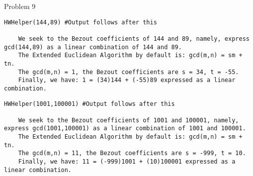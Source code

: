 \begin{problem}{Problem 9}
    \begin{Highlight}[Solution - \# 43]
    \begin{lstlisting}[style=stackoverflow]
    HWHelper(144,89) #Output follows after this

    We seek to the Bezout coefficients of 144 and 89, namely, express gcd(144,89) as a linear combination of 144 and 89.
    The Extended Euclidean Algorithm by default is: gcd(m,n) = sm + tn.
    The gcd(m,n) = 1, the Bezout coefficients are s = 34, t = -55.
    Finally, we have: 1 = (34)144 + (-55)89 expressed as a linear combination.
    \end{lstlisting}
    \end{Highlight}

    \begin{Highlight}[Solution - \# 44]
    \begin{lstlisting}[style=stackoverflow]
    HWHelper(1001,100001) #Output follows after this

    We seek to the Bezout coefficients of 1001 and 100001, namely, express gcd(1001,100001) as a linear combination of 1001 and 100001.
    The Extended Euclidean Algorithm by default is: gcd(m,n) = sm + tn.
    The gcd(m,n) = 11, the Bezout coefficients are s = -999, t = 10.
    Finally, we have: 11 = (-999)1001 + (10)100001 expressed as a linear combination.
    \end{lstlisting}
    \end{Highlight}
\end{problem}

